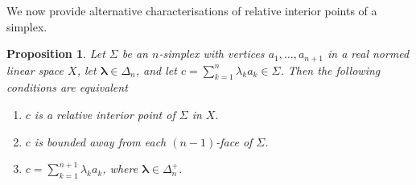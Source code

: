 \documentclass[11pt]{article}%
\newtheorem{proposition}[theorem]{Proposition}
\begin{document}
We now provide alternative characterisations of relative interior points of a simplex.

\begin{proposition}
\label{jul21p3}Let $\Sigma$ be an $n$-simplex with vertices $a_{1}%
,\ldots,a_{n+1}$ in a real normed linear space $X$, let $\mathbf{\lambda}%
\in\Delta_{n}$, and let $c=\sum_{k=1}^{n}\lambda_{k}a_{k}\in\Sigma$. Then the
following conditions are equivalent

\begin{enumerate}
\item[\emph{(i)}] $c$ is a relative interior point of $\Sigma$ in $X.$

\item[\emph{(ii)}] $c$ is bounded away from each $(n-1)$-face of $\Sigma$.

\item[\emph{(iii)}] $c=\sum_{k=1}^{n+1}\lambda_{k}a_{k}$, where
$\mathbf{\lambda}\in\Delta_{n}^{+}$.
\end{enumerate}
\end{proposition}
\end{document}
